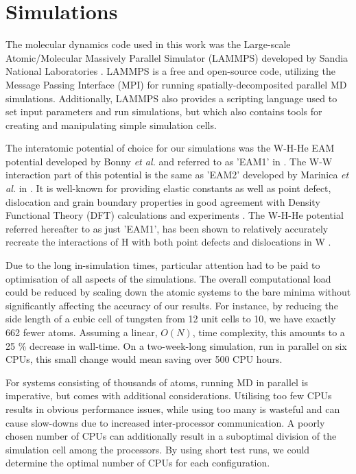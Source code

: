 \chapter{Simulations}

The molecular dynamics code used in this work was the Large-scale Atomic/Molecular Massively Parallel Simulator (LAMMPS) developed by Sandia National Laboratories \cite{lammpsMD}. 
LAMMPS is a free and open-source code, utilizing the Message Passing Interface (MPI) for running spatially-decomposited parallel MD simulations.
Additionally, LAMMPS also provides a scripting language used to set input parameters and run simulations, but which also contains tools for creating and manipulating simple simulation cells.    

The interatomic potential of choice for our simulations was the W-H-He EAM potential developed by Bonny \textit{et al.} and referred to as 'EAM1' in \cite{bonny2014binding}. 
The W-W interaction part of this potential is the same as 'EAM2' developed by Marinica \textit{et al.} in \cite{marinica2013interatomic}. 
It is well-known for providing elastic constants as well as point defect, dislocation and grain boundary properties in good agreement with Density Functional Theory (DFT) calculations and experiments \cite{bonny2014many}. 
The W-H-He potential referred hereafter to as just 'EAM1', has been shown to relatively accurately recreate the interactions of H with both point defects and dislocations in W \cite{bonny2014binding, grigorev2015interaction}. 

Due to the long in-simulation times, particular attention had to be paid to optimisation of all aspects of the simulations.
The overall computational load could be reduced by scaling down the atomic systems to the bare minima without significantly affecting the accuracy of our results.
For instance, by reducing the side length of a cubic cell of tungsten from 12 unit cells to 10, we have exactly 662 fewer atoms. 
Assuming a linear, $O(N)$, time complexity, this amounts to a 25 \% decrease in wall-time.
On a two-week-long simulation, run in parallel on six CPUs, this small change would mean saving over 500 CPU hours. 

For systems consisting of thousands of atoms, running MD in parallel is imperative, but comes with additional considerations.  
Utilising too few CPUs results in obvious performance issues, while using too many is wasteful and can cause slow-downs due to increased inter-processor communication.
A poorly chosen number of CPUs can additionally result in a suboptimal division of the simulation cell among the processors. 
By using short test runs, we could determine the optimal number of CPUs for each configuration.


